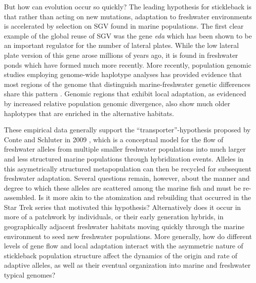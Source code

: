 \documentclass{article}
\begin{document}
 But how can evolution occur so quickly? The leading hypothesis for stickleback is that rather than acting on new mutations, adaptation to freshwater environments is accelerated by selection on SGV found in marine populations. The first clear example of the global reuse of SGV was the gene \textit{eda} which has been shown to be an important regulator for the number of lateral plates. While the low lateral plate version of this gene arose millions of years ago, it is found in freshwater ponds which have formed much more recently. More recently, population genomic studies employing genome-wide haplotype analyses has provided evidence that most regions of the genome that distinguish marine-freshwater genetic differences share this pattern \citep{nelson2017ancient}. Genomic regions that exhibit local adaptation, as evidenced by increased relative population genomic divergence, also show much older haplotypes that are enriched in the alternative habitats. 
 
These empirical data generally support the ``transporter''-hypothesis proposed by Conte and Schluter in 2009 \citet{schluter2009genetics}, which is a conceptual model for the flow of freshwater alleles from multiple smaller freshwater populations into much larger and less structured marine populations through hybridization events. Alleles in this asymetrically structured metapopulation can then be recycled for subsequent freshwater adaptation. Several questions remain, however, about the manner and degree to which these alleles are scattered among the marine fish and must be re-assembled. Is it more akin to the atomization and rebuilding that occurred in the Star Trek series that motivated this hypothesis? Alternatively does it occur in more of a patchwork by individuals, or their early generation hybrids, in geographically adjacent freshwater habitats moving quickly through the marine environment to seed new freshwater populations. More generally, how do different levels of gene flow and local adaptation interact with the asymmetric nature of stickleback population structure affect the dynamics of the origin and rate of adaptive alleles, as well as their eventual organization into marine and freshwater typical genomes? 
\end{document}
